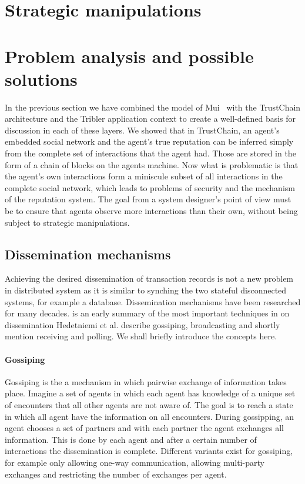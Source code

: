 \section{Strategic manipulations}


\section{Problem analysis and possible solutions}
In the previous section we have combined the model of Mui~\cite{mui2002computational} with the 
TrustChain architecture and the Tribler application context to create a well-defined basis for
discussion in each of these layers. We showed that in TrustChain, an agent's embedded social network 
and the agent's true reputation can be inferred simply from the complete set of interactions that 
the agent had. Those are stored in the form of a chain of blocks on the agents machine. Now what is
problematic is that the agent's own interactions form a miniscule subset of all interactions in the 
complete social network, which leads to problems of security and the mechanism of the reputation 
system. The goal from a system designer's point of view must be to ensure that agents observe more 
interactions than their own, without being subject to strategic manipulations.

\subsection{Dissemination mechanisms}
Achieving the desired dissemination of transaction records is not a new problem in distributed 
system as it is similar to synching the two stateful disconnected systems, for example a database.
Dissemination mechanisms have been researched for many decades. \cite{hedetniemi1988survey} is an 
early summary of the most important techniques in on dissemination Hedetniemi et al. describe 
gossiping, broadcasting and shortly mention receiving and polling. We shall briefly introduce the 
concepts here.

\paragraph{Gossiping} Gossiping is the a mechanism in which pairwise exchange of information takes 
place. Imagine a set of agents in which each agent has knowledge of a unique set of encounters that
all other agents are not aware of. The goal is to reach a state in which all agent have the
information on all encounters. During gossipping, an agent chooses a set of partners and with each 
partner the agent exchanges all information. This is done by each agent and after a certain number
of interactions the dissemination is complete. Different variants exist for gossiping, for example
only allowing one-way communication, allowing multi-party exchanges and restricting the number of 
exchanges per agent. 


